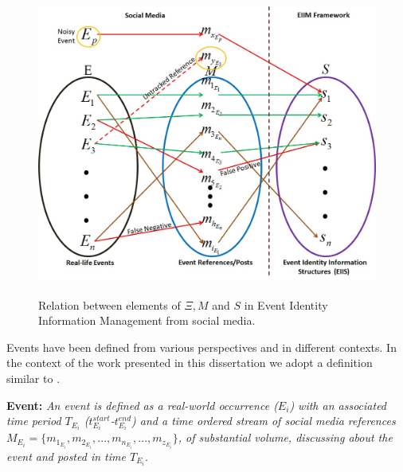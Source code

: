 %
%

\begin{figure}[htbp]
  \caption{Relation between elements of $\Xi,M$ and $S$ in Event Identity Information Management from social media.}
\label{eventresolutionmappings}
  \centering
    \includegraphics[width=12cm,height=10cm]{Figures/EventResolutionMappings.jpg}
\end{figure}


Events have been defined from various perspectives and in different contexts. In the context of the work presented in this dissertation we adopt a definition similar to \cite{becker2011beyond}. 


\textbf{Event:} \textit{An event is defined as a real-world occurrence ($ E_{i}$) with an associated time period $T_{E_{i}}$ ($t^{start}_{E_{i}}$-$t^{end}_{E_{i}}$) and a time ordered stream of social media references $M_{E_{i}} = {\{m_{1_{E_{i}}},m_{2_{E_{i}}}, ... ,m_{n_{E_{i}}}, ... ,m_{z_{E_{i}}}\}}$, of substantial volume, discussing about the event and posted in time $T_{E_{i}}$}.

